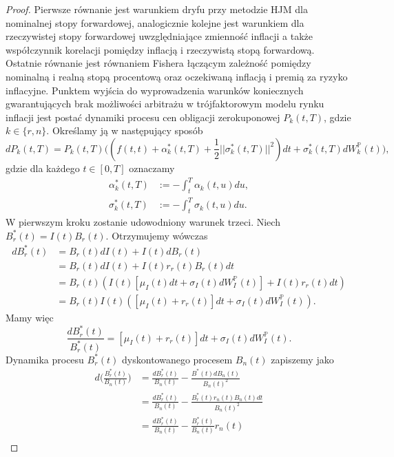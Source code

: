\documentclass{mini}
\theoremstyle{mythstyle}
\begin{document}
	\begin{proof}
		
		Pierwsze równanie  jest warunkiem dryfu przy metodzie HJM dla nominalnej stopy forwardowej, analogicznie kolejne jest warunkiem dla rzeczywistej stopy forwardowej uwzględniające zmienność inflacji a także współczynnik korelacji pomiędzy inflacją i rzeczywistą stopą forwardową. Ostatnie równanie jest równaniem Fishera łączącym zależność pomiędzy nominalną i realną stopą procentową oraz oczekiwaną inflacją i premią za ryzyko inflacyjne. Punktem wyjścia do wyprowadzenia warunków koniecznych gwarantujących brak możliwości arbitrażu w trójfaktorowym modelu rynku inflacji jest postać dynamiki procesu cen obligacji zerokuponowej $P_k(t,T)$, gdzie $k \in\{r,n\}$. Określamy ją w następujący sposób
		\begin{equation*}
		dP_k(t,T) = P_k(t,T) \bigg((f(t,t)+\alpha_k^*(t,T)+\frac{1}{2} ||\sigma_k^*(t,T)||^2 )dt +\sigma_k^*(t,T) dW_k^\mathbb{P}(t)\bigg),
		\end{equation*}
		gdzie dla każdego $t\in[0,T]$ oznaczamy
		\begin{align}
		\alpha_k^*(t,T) &:= - \int_{t}^{T} \alpha_k(t,u) du,\\
		\sigma_k^*(t,T) &:= - \int_{t}^{T} \sigma_k(t,u) du.
		\end{align}
		W pierwszym kroku zostanie udowodniony warunek trzeci. Niech $B_r^*(t) = I(t) B_r(t)$. Otrzymujemy wówczas
		\begin{align*}
		d B_r^*(t) &= B_r(t) dI(t) + I(t)dB_r(t) \\
		&= B_r(t) dI(t) + I(t)r_r(t) B_r(t) dt \\
		&= B_r(t) (I(t) [\mu_I(t)dt + \sigma_I(t)dW_I^\mathbb{P}(t) ] + I(t)r_r(t)dt) \\
		&= B_r(t) I(t) ([\mu_I(t) + r_r(t) ]dt + \sigma_I(t) dW_I^\mathbb{P}(t)).
		\end{align*}
		Mamy więc
		\begin{equation}
		\frac{dB_r^*(t)}{B_r^*(t)} = [\mu_I(t) + r_r(t) ]dt + \sigma_I(t) dW_I^\mathbb{P}(t).
		\end{equation}
		Dynamika procesu $B_r^*(t)$ dyskontowanego procesem $B_n(t)$ zapiszemy jako
		\begin{align*}
		d\bigg(\frac{B_r^*(t)}{B_n(t)}\bigg) &= \frac{d B_r^*(t)}{B_n(t)} - \frac{B^*(t) d B_n(t)}{B_n(t)^2}\\
		&= \frac{d B_r^*(t)}{B_n(t)} - \frac{B_r^*(t)r_n(t)B_n(t)dt}{B_n(t)^2}\\
		&= \frac{d B_r^*(t)}{B_n(t)} - \frac{B_r^*(t)}{B_n(t)}r_n(t)\\

\end{align*}
\end{proof}
\end{document}

